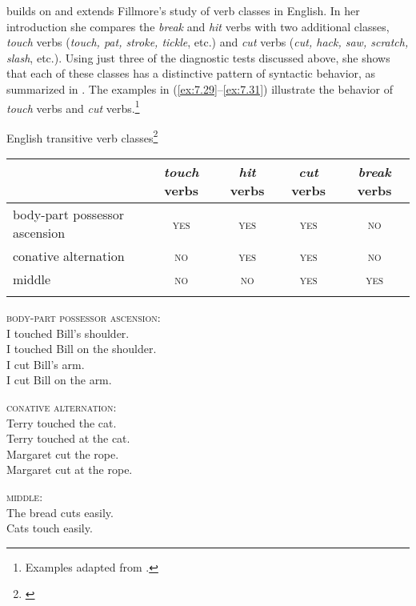 \citet{Levin1993} builds on and extends Fillmore’s study of verb classes in English. In her introduction she compares the \textit{break} and \textit{hit} verbs with two additional classes, \textit{touch} verbs (\textit{touch, pat, stroke, tickle}, etc.) and \textit{cut} verbs (\textit{cut, hack, saw, scratch, slash}, etc.). Using just three of the diagnostic tests discussed above, she shows that each of these classes has a distinctive pattern of syntactic behavior, as summarized in . The examples in (\ref{ex:7.29}--\ref{ex:7.31}) illustrate the behavior of \textit{touch} verbs and \textit{cut} verbs.\footnote{Examples adapted from \citet[6--7]{Levin1993}.}


\ea \label{ex:7.28} English transitive verb classes\footnote{\citet[8]{Levin1993}}\\
\begin{tabularx}{.9\textwidth}{Qcccc} 
\lsptoprule
& \textit{touch} verbs & \textit{hit} verbs & \textit{cut} verbs & \textit{break} verbs\\
\midrule
body-part possessor ascension & \scshape yes & \scshape yes & \scshape yes & \scshape no\\
\tablevspace
conative alternation & \scshape no & \scshape yes & \scshape yes & \scshape no\\
\tablevspace
middle & \scshape no & \scshape no & \scshape yes & \scshape yes\\
\lspbottomrule
\end{tabularx}
\z

\ea \label{ex:7.29}
\textsc{body-part possessor ascension}:\\
\ea  I touched Bill’s shoulder.\\
\ex  I touched Bill on the shoulder.\\
\ex  I cut Bill’s arm.\\
\ex  I cut Bill on the arm.
                       \z
\z

\ea \label{ex:7.39}  \textsc{conative alternation}:\\
\ea  Terry touched the cat.\\
\ex *Terry touched at the cat.\\
\ex  Margaret cut the rope.\\
\ex  Margaret cut at the rope.
                       \z
\z

\ea \label{ex:7.31}
\textsc{middle}:\\
\ea  The bread cuts easily.\\
\ex *Cats touch easily.
                       \z
\z


